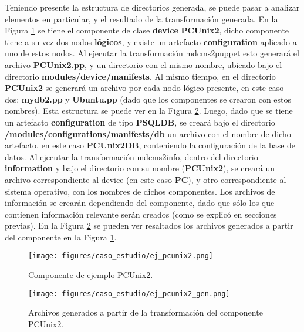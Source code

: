 Teniendo presente la estructura de directorios generada, se puede pasar a analizar elementos en particular, y el resultado de la transformación generada. En la Figura \ref{fig:caso_estudio:ejemplo_pcunix2} se tiene el componente de clase \textbf{device} \textbf{PCUnix2}, dicho componente tiene a su vez dos nodos \textbf{lógicos}, y existe un artefacto \textbf{configuration} aplicado a uno de estos nodos. Al ejecutar la transformación mdcms2puppet esto generará el archivo \textbf{PCUnix2.pp}, y un directorio con el mismo nombre, ubicado bajo el directorio \textbf{modules/device/manifests}. Al mismo tiempo, en el directorio \textbf{PCUnix2} se generará un archivo por cada nodo lógico presente, en este caso dos: \textbf{mydb2.pp} y \textbf{Ubuntu.pp} (dado que los componentes se crearon con estos nombres). Esta estructura se puede ver en la Figura \ref{fig:caso_estudio:ejemplo_pcunix2_gen}.
Luego, dado que se tiene un artefacto \textbf{configuration} de tipo \textbf{PSQLDB}, se creará bajo el directorio \textbf{/modules/configurations/manifests/db} un archivo con el nombre de dicho artefacto, en este caso \textbf{PCUnix2DB}, conteniendo la configuración de la base de datos.
Al ejecutar la transformación mdcms2info, dentro del directorio \textbf{information} y bajo el directorio con su nombre (\textbf{PCUnix2}), se creará un archivo correspondiente al device (en este caso \textbf{PC}), y otro correspondiente al sistema operativo, con los nombres de dichos componentes. Los archivos de información se crearán dependiendo del componente, dado que sólo los que contienen información relevante serán creados (como se explicó en secciones previas).
En la Figura \ref{fig:caso_estudio:ejemplo_pcunix2_gen} se pueden ver resaltados los archivos generados a partir del componente en la Figura \ref{fig:caso_estudio:ejemplo_pcunix2}.

\begin{figure}[htbp]
    \centering
    \texttt{[image: figures/caso\_estudio/ej\_pcunix2.png]}
    \caption{Componente de ejemplo PCUnix2.}
    \label{fig:caso_estudio:ejemplo_pcunix2}
\end{figure}

\begin{figure}[htbp]
    \centering
    \texttt{[image: figures/caso\_estudio/ej\_pcunix2\_gen.png]}
    \caption{Archivos generados a partir de la transformación del componente PCUnix2.}
    \label{fig:caso_estudio:ejemplo_pcunix2_gen}
\end{figure}

